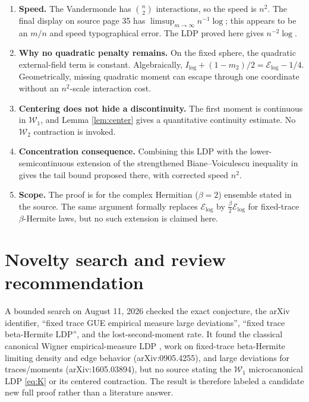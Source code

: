 \documentclass[11pt]{article}
\newcommand{\W}{\mathcal W}
\newcommand{\E}{\mathcal E_{\log}}
\begin{document}
\begin{enumerate}[leftmargin=*]
\item \textbf{Speed.} The Vandermonde has $\binom n2$ interactions, so the
  speed is $n^2$. The final display on source page 35 has
  $\limsup_{m\to\infty}n^{-1}\log$; this appears to be an $m/n$ and speed
  typographical error. The LDP proved here gives $n^{-2}\log$.

\item \textbf{Why no quadratic penalty remains.} On the fixed sphere, the
  quadratic external-field term is constant. Algebraically,
  $I_{\log}+(1-m_2)/2=\E-1/4$. Geometrically, missing quadratic moment can
  escape through one coordinate without an $n^2$-scale interaction cost.

\item \textbf{Centering does not hide a discontinuity.} The first moment is
  continuous in $\W_1$, and Lemma \ref{lem:center} gives a quantitative
  continuity estimate. No $\W_2$ contraction is invoked.

\item \textbf{Concentration consequence.} Combining this LDP with the
  lower-semicontinuous extension of the strengthened Biane--Voiculescu
  inequality in \cite{CL} gives the tail bound proposed there, with corrected
  speed $n^2$.

\item \textbf{Scope.} The proof is for the complex Hermitian ($\beta=2$)
  ensemble stated in the source. The same argument formally replaces $\E$
  by $\frac\beta2\E$ for fixed-trace $\beta$-Hermite laws, but no such
  extension is claimed here.
\end{enumerate}

\section{Novelty search and review recommendation}

A bounded search on August 11, 2026 checked the exact conjecture, the arXiv
identifier, ``fixed trace GUE empirical measure large deviations'',
``fixed trace beta-Hermite LDP'', and the lost-second-moment rate. It found
the classical canonical Wigner empirical-measure LDP \cite{BG}, work on
fixed-trace beta-Hermite limiting density and edge behavior
(arXiv:0905.4255), and large deviations for traces/moments
(arXiv:1605.03894), but no source stating the $\W_1$ microcanonical LDP
\eqref{eq:K} or its centered contraction. The result is therefore labeled a
candidate new full proof rather than a literature answer.
\end{document}
